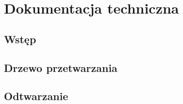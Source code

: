 \chapter{Dokumentacja techniczna}

\section{Wstęp}





\section{Drzewo przetwarzania}

\section{Odtwarzanie}


